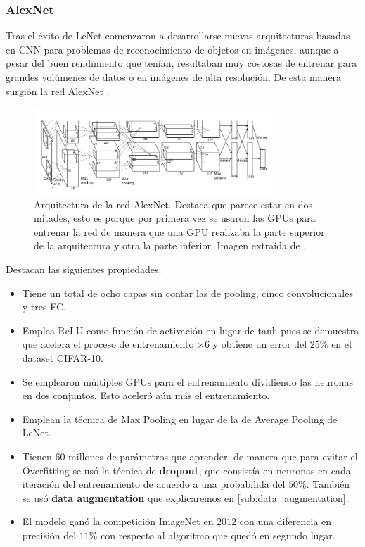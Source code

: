         \subsubsection{AlexNet}
            \noindent Tras el éxito de LeNet comenzaron a desarrollarse nuevas arquitecturas basadas en CNN para problemas de reconocimiento de objetos en imágenes, aunque a pesar del buen rendimiento que tenían, resultaban muy costosas de entrenar para grandes volúmenes de datos o en imágenes de alta resolución. De esta manera surgión la red AlexNet \cite{krizhevsky2012imagenet}.

            \begin{figure}[!h]
                \centering
                \includegraphics[width=0.8\textwidth]{img/AlexNet.png}
                \caption{Arquitectura de la red AlexNet. Destaca que parece estar  en dos mitades, esto es porque por primera vez se usaron las GPUs para entrenar la red de manera que una GPU realizaba la parte superior de la arquitectura y otra la parte inferior. Imagen extraída de \cite{krizhevsky2012imagenet}.}
                \label{fig:AlexNet}
            \end{figure}

            \noindent Destacan las siguientes propiedades:

            \begin{itemize}
                \item Tiene un total de ocho capas sin contar las de pooling, cinco convolucionales y tres FC.
                \item Emplea ReLU como función de activación en lugar de tanh pues se demuestra que acelera el proceso de entrenamiento $\times 6$ y obtiene un error del $25\%$ en el dataset CIFAR-10.
                \item Se emplearon múltiples GPUs para el entrenamiento dividiendo las neuronas en dos conjuntos. Esto aceleró aún más el entrenamiento.
                \item Emplean la técnica de Max Pooling en lugar de la de Average Pooling de LeNet. 
                \item Tienen 60 millones de parámetros que aprender, de manera que para evitar el Overfitting se usó la técnica de \textbf{dropout}, que consistía en  neuronas en cada iteración del entrenamiento de acuerdo a una probabilida del $50\%$. También se usó \textbf{data augmentation} que explicaremos en \autoref{sub:data_augmentation}.
                \item El modelo ganó la competición ImageNet en $2012$ con una diferencia en precisión del $11\%$ con respecto al algoritmo que quedó en segundo lugar.
            \end{itemize}
        

